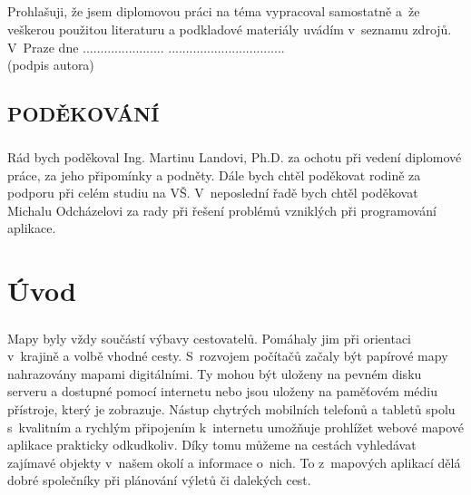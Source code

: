 \documentclass[11pt,a4paper,titlepage,oneside]{book}
\begin{document}
		\paragraph{}Prohlašuji, že jsem diplomovou práci na téma  vypracoval samostatně a~že veškerou použitou literaturu a podkladové materiály uvádím v~seznamu zdrojů.\\[1cm]
	V~Praze dne ....................... ................................. \\
	 {(podpis autora)\hspace{0.25cm} }
	
\newpage %
	\vspace*{15cm}
	\section*{\Large PODĚKOVÁNÍ}
	\paragraph{} Rád bych poděkoval Ing. Martinu Landovi, Ph.D. za ochotu při vedení diplomové práce, za jeho připomínky a podněty. Dále bych chtěl poděkovat rodině za podporu při celém studiu na VŠ. V~neposlední řadě bych chtěl poděkovat Michalu Odcházelovi za rady při řešení problémů vzniklých při programování aplikace.
		
\renewcommand{\baselinestretch}{1.5} %
\newpage %
\pagestyle{plain}
\setcounter{page}{5}

	\tableofcontents

\newpage %
	\listoffigures

\newpage %
\chapter*{Úvod}



	\paragraph{} Mapy byly vždy součástí výbavy cestovatelů. Pomáhaly jim při orientaci v~krajině a volbě vhodné cesty. S~rozvojem počítačů začaly být papírové mapy nahrazovány mapami digitálními. Ty mohou být uloženy na pevném disku serveru a dostupné pomocí internetu nebo jsou uloženy na paměťovém médiu přístroje, který je zobrazuje. Nástup chytrých mobilních telefonů a tabletů spolu s~kvalitním a rychlým připojením k~internetu umožňuje prohlížet webové mapové aplikace prakticky odkudkoliv. Díky tomu můžeme na cestách vyhledávat zajímavé objekty v~našem okolí a informace o~nich. To z~mapových aplikací dělá dobré společníky při plánování výletů či dalekých cest.
\end{document}
